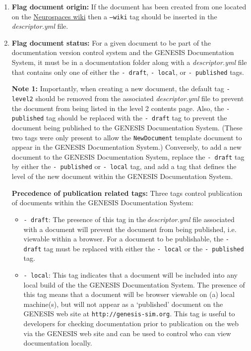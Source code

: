 \documentclass[12pt]{article}
\begin{document}
\begin{enumerate}
\begin{enumerate}
\item {\bf Flag document origin:} If the document has been created from one located on the \href{http://code.google.com/p/neurospaces/w/list}{Neurospaces wiki} then a {\tt --wiki} tag should be inserted in the {\it descriptor.yml} file.

\item {\bf Flag document status:} For a given document to be part of the documentation version control system and the GENESIS Documentation System, it must be in a documentation folder along with a {\it descriptor.yml} file that contains only one of either the {\tt -\,draft}, {\tt -\,local}, or {\tt -\,published} tags.

{\bf Note 1:} Importantly, when creating a new document, the default tag {\tt -\,level2} should be removed from the associated {\it descriptor.yml} file to prevent the document from being listed in the level 2 contents page. Also, the {\tt-\,published} tag should be replaced with the {\tt -\,draft} tag to prevent the document being published to the GENESIS Documentation System. (These two tags were only present to allow the {\tt NewDocument} template document to appear in the GENESIS Documentation System.) Conversely, to add a new document to the GENESIS Documentation System, replace the {\tt -\,draft} tag by either the {\tt -\,published} or {\tt -\,local} tag, and add a tag that defines the level of the new document within the GENESIS Documentation System.  

{\bf Precedence of publication related tags:} Three tags control publication of documents within the GENESIS Documentation System:
\begin{itemize}
	\item[]{\tt -\,draft}: The presence of this tag in the\,{\it descriptor.yml} file associated with a document will prevent the document 
	from being published,  i.e. viewable within a browser. For a document to be publishable, the {\tt -\,draft} tag must be replaced 
	with either the {\tt -\,local} or the {\tt -\,published} tag.
	
	\item[]{\tt -\,local}: This tag indicates that a document will be included into any local build of the the GENESIS Documentation 
	System. The presence of this tag means that a document will be browser viewable on (a) local machine(s), but will not appear as a `published' 
	document on the GENESIS web site at {\tt http://genesis-sim.org}. This tag is useful to developers for checking documentation prior to publication on the web via the GENESIS web site and can be used to control who can view documentation locally.
	

\end{itemize}
\end{enumerate}
\end{enumerate}
\end{document}
